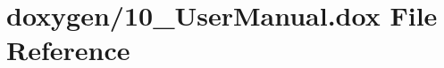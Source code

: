 \hypertarget{10__UserManual_8dox}{\section{doxygen/10\+\_\+\+User\+Manual.dox File Reference}
\label{10__UserManual_8dox}
}
